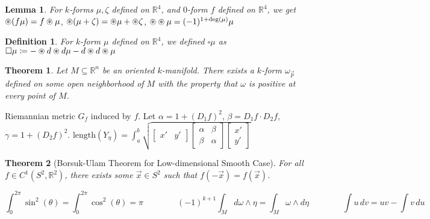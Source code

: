 \documentclass[9pt]{article}
\theoremstyle{break}
\theoremstyle{break}
\newtheorem{thm}{Theorem}[section]
\newtheorem{lem}{Lemma}[thm]
\newtheorem{defn}{Definition}[corL]
\newcommand{\R}{\mathbb{R}}
\newcommand{\bmat}[1]{\begin{bmatrix} #1 \end{bmatrix}}
\newcommand\oast{\stackMath\mathbin{\stackinset{c}{0ex}{c}{0ex}{\ast}{\Circle}}}
\begin{document}
\begin{lem}
For $k$-forms $\mu, \zeta$ defined on $\R^4$, and $0$-form $f$ defined on $\R^4$, we get $\oast (f\mu) = f\oast \mu$, $\oast (\mu + \zeta) = \oast \mu + \oast \zeta$, $\oast \oast \mu = (-1)^{1+ \deg(\mu)}\mu$
\end{lem}

\begin{defn}
For $k$-form $\mu$ defined on $\R^4$, we defined $\square \mu$ as $
\square \mu \coloneqq -\oast d\oast d\mu - d\oast d\oast \mu$
\end{defn}

\begin{thm}
Let $M \subseteq \R^n$ be an oriented $k$-manifold. There exists a $k$-form $\omega_{\vec{p}}$ defined on some open neighborhood of $M$ with the property that $\omega$ is positive at every point of $M$.
\end{thm}

Riemannian metric $G_f$ induced by $f$. Let $\alpha = 1+\left(D_1f\right)^2$, $\beta = D_1f \cdot D_2f$, $\gamma = 1+\left(D_2f\right)^2$.  $\text{length}(Y_{\eta}) = \int_a^b \sqrt{\bmat{x'& y'}\bmat{\alpha &\beta \\ \beta & \alpha} \bmat{x' \\ y'}}$

\begin{thm}[Borsuk-Ulam Theorem for Low-dimensional Smooth Case]
For all $f \in C^1(S^2, \R^2)$, there exists some $\vec{x}\in S^2$ such that $f(-\vec{x}) = f(\vec{x})$.
\end{thm}

$$\int_0^{2\pi}\sin^2(\theta)=\int _0^{2\pi }\cos ^2\left(\theta\right) = \pi \qquad\qquad(-1)^{k+1} \int_M d\omega \wedge \eta =  \int_M \omega \wedge d\eta\qquad\qquad \int u\, dv =uv - \int v\, du $$
\end{document}
